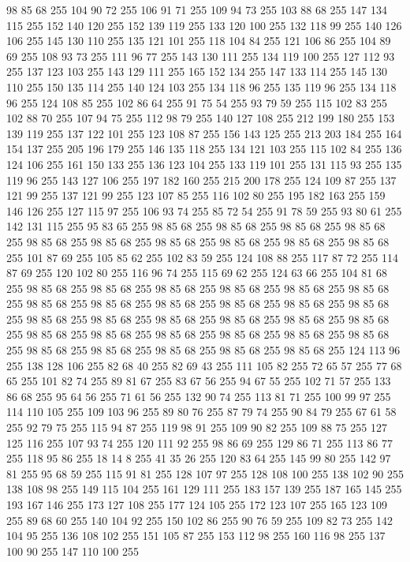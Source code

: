 98 85 68 255 104 90 72 255 106 91 71 255 109 94 73 255 103 88 68 255 147 134 115 255 152 140 120 255 152 139 119 255 133 120 100 255 132 118 99 255 140 126 106 255 145 130 110 255 135 121 101 255 118 104 84 255 121 106 86 255 104 89 69 255 108 93 73 255 111 96 77 255 143 130 111 255 134 119 100 255 127 112 93 255 137 123 103 255 143 129 111 255 165 152 134 255 147 133 114 255 145 130 110 255 150 135 114 255 140 124 103 255 134 118 96 255 135 119 96 255 134 118 96 255 124 108 85 255 102 86 64 255 91 75 54 255 93 79 59 255 115 102 83 255 102 88 70 255 107 94 75 255 112 98 79 255 140 127 108 255 212 199 180 255 153 139 119 255 137 122 101 255 123 108 87 255 156 143 125 255 213 203 184 255 164 154 137 255 205 196 179 255 146 135 118 255 134 121 103 255 115 102 84 255 136 124 106 255 161 150 133 255 136 123 104 255 133 119 101 255 131 115 93 255 135 119 96 255 143 127 106 255 197 182 160 255 215 200 178 255 124 109 87 255 137 121 99 255 137 121 99 255 123 107 85 255
116 102 80 255 195 182 163 255 159 146 126 255 127 115 97 255 106 93 74 255 85 72 54 255 91 78 59 255 93 80 61 255 142 131 115 255 95 83 65 255 98 85 68 255 98 85 68 255 98 85 68 255 98 85 68 255 98 85 68 255 98 85 68 255 98 85 68 255 98 85 68 255 98 85 68 255 98 85 68 255 101 87 69 255 105 85 62 255 102 83 59 255 124 108 88 255 117 87 72 255 114 87 69 255 120 102 80 255 116 96 74 255 115 69 62 255 124 63 66 255 104 81 68 255 98 85 68 255 98 85 68 255 98 85 68 255 98 85 68 255 98 85 68 255 98 85 68 255 98 85 68 255 98 85 68 255 98 85 68 255 98 85 68 255 98 85 68 255 98 85 68 255 98 85 68 255 98 85 68 255 98 85 68 255 98 85 68 255 98 85 68 255 98 85 68 255 98 85 68 255 98 85 68 255 98 85 68 255 98 85 68 255 98 85 68 255 98 85 68 255 98 85 68 255 98 85 68 255 98 85 68 255 98 85 68 255 98 85 68 255 124 113 96 255 138 128 106 255 82 68 40 255 82 69 43 255
111 105 82 255 72 65 57 255 77 68 65 255 101 82 74 255 89 81 67 255 83 67 56 255 94 67 55 255 102 71 57 255 133 86 68 255 95 64 56 255 71 61 56 255 132 90 74 255 113 81 71 255 100 99 97 255 114 110 105 255 109 103 96 255 89 80 76 255 87 79 74 255 90 84 79 255 67 61 58 255 92 79 75 255 115 94 87 255 119 98 91 255 109 90 82 255 109 88 75 255 127 125 116 255 107 93 74 255 120 111 92 255 98 86 69 255 129 86 71 255 113 86 77 255 118 95 86 255 18 14 8 255 41 35 26 255 120 83 64 255 145 99 80 255 142 97 81 255 95 68 59 255 115 91 81 255 128 107 97 255 128 108 100 255 138 102 90 255 138 108 98 255 149 115 104 255 161 129 111 255 183 157 139 255 187 165 145 255 193 167 146 255 173 127 108 255 177 124 105 255 172 123 107 255 165 123 109 255 89 68 60 255 140 104 92 255 150 102 86 255 90 76 59 255 109 82 73 255 142 104 95 255 136 108 102 255 151 105 87 255 153 112 98 255 160 116 98 255 137 100 90 255 147 110 100 255
